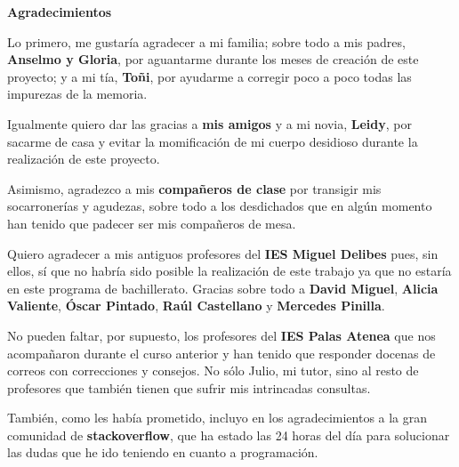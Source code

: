 \documentclass[a4paper, 11pt]{report} %
\begin{document}
\newpage
\setcounter{page}{6}
\vspace*{2.5cm}
\centerline{\color{chaptercolour}\normalfont\huge\bfseries Agradecimientos}
\thispagestyle{empty}
\vspace*{50pt}

Lo primero, me gustaría agradecer a mi familia; sobre todo a mis padres, \textbf{Anselmo y Gloria}, por aguantarme durante los meses de creación de este proyecto; y a mi tía, \textbf{Toñi}, por ayudarme a corregir poco a poco todas las impurezas de la memoria.

Igualmente quiero dar las gracias a \textbf{mis amigos} y a mi novia, \textbf{Leidy}, por sacarme de casa y evitar la momificación de mi cuerpo desidioso durante la realización de este proyecto.

Asimismo, agradezco a mis \textbf{compañeros de clase} por transigir mis socarronerías y agudezas, sobre todo a los desdichados que en algún momento han tenido que padecer ser mis compañeros de mesa.

Quiero agradecer a mis antiguos profesores del \textbf{IES Miguel Delibes} pues, sin ellos, sí que no habría sido posible la realización de este trabajo ya que no estaría en este programa de bachillerato. Gracias sobre todo a \textbf{David Miguel}, \textbf{Alicia Valiente}, \textbf{Óscar Pintado}, \textbf{Raúl Castellano} y \textbf{Mercedes Pinilla}.

No pueden faltar, por supuesto, los profesores del \textbf{IES Palas Atenea} que nos acompañaron durante el curso anterior y han tenido que responder docenas de correos con correcciones y consejos. No sólo Julio, mi tutor, sino al resto de profesores que también tienen que sufrir mis intrincadas consultas.

También, como les había prometido, incluyo en los agradecimientos a la gran comunidad de \textbf{stackoverflow}, que ha estado las 24 horas del día para solucionar las dudas que he ido teniendo en cuanto a programación.
\vspace*{\fill}

\end{document}
